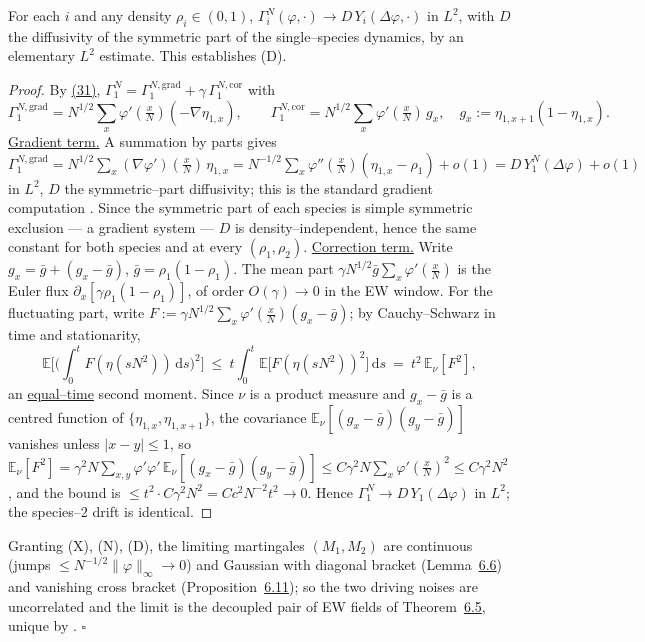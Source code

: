 \documentclass[11pt]{article}
\theoremstyle{plain}
\theoremstyle{definition}
\theoremstyle{remark}
\newcommand{\E}{\mathbb{E}}\newcommand{\PP}{\mathbb{P}}\newcommand{\dd}{\,\mathrm{d}}
\begin{document}
For each $i$ and any density $\rho_i\in(0,1)$,
$\Gamma_i^N(\varphi,\cdot)\to D\,Y_i(\Delta\varphi,\cdot)$ in $L^2$, with $D$ the
diffusivity of the symmetric part of the single--species dynamics, by an elementary
$L^2$ estimate. This establishes \textup{(D)}.
\par
\begin{proof}
By \hyperref[eq_Wgrad]{(31)}, $\Gamma_1^N=\Gamma_1^{N,\mathrm{grad}}+\gamma\,\Gamma_1^{N,\mathrm{cor}}$
with
\[
  \Gamma_1^{N,\mathrm{grad}}=N^{1/2}\sum_x\varphi'(\tfrac xN)(-\nabla\eta_{1,x}),\qquad
  \Gamma_1^{N,\mathrm{cor}}=N^{1/2}\sum_x\varphi'(\tfrac xN)\,g_x,\quad g_x:=\eta_{1,x+1}(1-\eta_{1,x}).
\]
\underline{Gradient term.} A summation by parts gives
$\Gamma_1^{N,\mathrm{grad}}=N^{1/2}\sum_x(\nabla\varphi')(\tfrac xN)\,\eta_{1,x}
 =N^{-1/2}\sum_x\varphi''(\tfrac xN)(\eta_{1,x}-\rho_1)+o(1)=D\,Y_1^N(\Delta\varphi)+o(1)$
in $L^2$, $D$ the symmetric--part diffusivity; this is the standard gradient
computation \cite[Ch.~11]{KL}. Since the symmetric part of each species is simple
symmetric exclusion --- a gradient system --- $D$ is density--independent, hence the same
constant for both species and at every $(\rho_1,\rho_2)$.
\underline{Correction term.} Write $g_x=\bar g+(g_x-\bar g)$, $\bar g=\rho_1(1-\rho_1)$. The mean
part $\gamma N^{1/2}\bar g\sum_x\varphi'(\tfrac xN)$ is the Euler flux
$\partial_x[\gamma\rho_1(1-\rho_1)]$, of order $O(\gamma)\to0$ in the EW window. For the
fluctuating part, write $F:=\gamma N^{1/2}\sum_x\varphi'(\tfrac xN)(g_x-\bar g)$; by
Cauchy--Schwarz in time and stationarity,
\[
  \E\Big[\Big(\int_0^t F(\eta(sN^2))\dd s\Big)^2\Big]
  \ \le\ t\int_0^t\E\big[F(\eta(sN^2))^2\big]\dd s\ =\ t^2\,\E_\nu[F^2],
\]
an \underline{equal--time} second moment. Since $\nu$ is a product measure and $g_x-\bar g$
is a centred function of $\{\eta_{1,x},\eta_{1,x+1}\}$, the covariance
$\E_\nu[(g_x-\bar g)(g_y-\bar g)]$ vanishes unless $|x-y|\le1$, so
$\E_\nu[F^2]=\gamma^2N\sum_{x,y}\varphi'\varphi'\,\E_\nu[(g_x-\bar g)(g_y-\bar g)]
\le C\gamma^2N\sum_x\varphi'(\tfrac xN)^2\le C\gamma^2N^2$, and the bound is
$\le t^2\cdot C\gamma^2N^2=Cc^2N^{-2}t^2\to0$. Hence $\Gamma_1^N\to D\,Y_1(\Delta\varphi)$
in $L^2$; the species--$2$ drift is identical.
\end{proof}

\noindent Granting (X), (N), (D), the limiting martingales $(M_1,M_2)$ are continuous
(jumps $\le N^{-1/2}\|\varphi\|_\infty\to0$) and Gaussian with diagonal bracket
(Lemma~\hyperref[lem_gauss]{6.6}) and vanishing cross bracket (Proposition~\hyperref[prop_conc]{6.11}); so
the two driving noises are uncorrelated and the limit is the decoupled pair of EW
fields of Theorem~\hyperref[thm_ewmain]{6.5}, unique by \cite[Ch.~11]{KL}. \hfill$\square$
\end{document}
